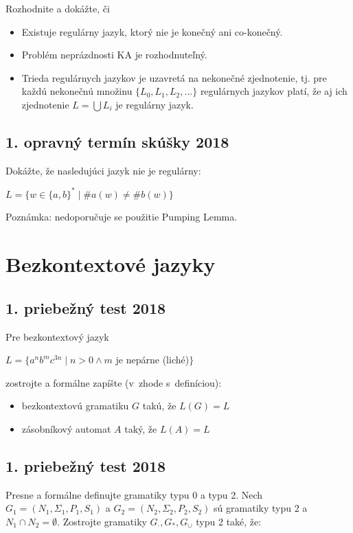 \documentclass[11pt,a4paper]{article}
\begin{document}
		Rozhodnite a dokážte, či

		\begin{itemize}
			\item Existuje regulárny jazyk, ktorý nie je konečný ani co-konečný.
			\item Problém neprázdnosti KA je rozhodnuteľný.
			\item Trieda regulárnych jazykov je uzavretá na nekonečné zjednotenie, tj. pre každú nekonečnú množinu $\{L_0, L_1, L_2, \ldots\}$ regulárnych jazykov platí, že aj ich zjednotenie $L = \bigcup L_i$ je regulárny jazyk.
		\end{itemize}

		 \subsection{1. opravný termín skúšky 2018}

		 Dokážte, že nasledujúci jazyk nie je regulárny:

		 $L = \{w \in \{a,b\}^* \mid \#a(w) \neq \#b(w)\}$

		 Poznámka: nedoporučuje se použitie Pumping Lemma.

	\section{Bezkontextové jazyky}

		\subsection{1. priebežný test 2018}

		Pre bezkontextový jazyk

		$L = \{a^nb^mc^{3n} \mid n > 0 \land m$ je nepárne (liché)$\}$

		zostrojte a formálne zapíšte (v~zhode s~definíciou):
		\begin{itemize}
			\item bezkontextovú gramatiku $G$ takú, že $L(G) = L$
			\item zásobníkový automat $A$ taký, že $L(A) = L$
		\end{itemize}

		\subsection{1. priebežný test 2018}

		Presne a formálne definujte gramatiky typu 0 a typu 2. Nech $G_1 = (N_1, \Sigma_1, P_1, S_1)$ a $G_2 = (N_2, \Sigma_2, P_2, S_2)$ sú gramatiky typu 2 a $N_1 \cap N_2 = \emptyset$. Zostrojte gramatiky $G_{\cdot}, G_*, G_{\cup}$ typu 2 také, že:
\end{document}
